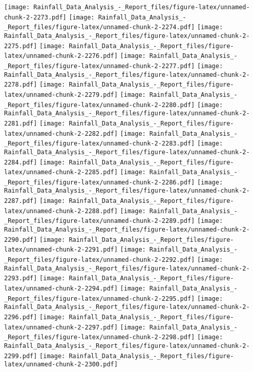 \documentclass[
]{article}
\begin{document}
\texttt{[image: Rainfall\_Data\_Analysis\_-\_Report\_files/figure-latex/unnamed-chunk-2-2273.pdf]}
\texttt{[image: Rainfall\_Data\_Analysis\_-\_Report\_files/figure-latex/unnamed-chunk-2-2274.pdf]}
\texttt{[image: Rainfall\_Data\_Analysis\_-\_Report\_files/figure-latex/unnamed-chunk-2-2275.pdf]}
\texttt{[image: Rainfall\_Data\_Analysis\_-\_Report\_files/figure-latex/unnamed-chunk-2-2276.pdf]}
\texttt{[image: Rainfall\_Data\_Analysis\_-\_Report\_files/figure-latex/unnamed-chunk-2-2277.pdf]}
\texttt{[image: Rainfall\_Data\_Analysis\_-\_Report\_files/figure-latex/unnamed-chunk-2-2278.pdf]}
\texttt{[image: Rainfall\_Data\_Analysis\_-\_Report\_files/figure-latex/unnamed-chunk-2-2279.pdf]}
\texttt{[image: Rainfall\_Data\_Analysis\_-\_Report\_files/figure-latex/unnamed-chunk-2-2280.pdf]}
\texttt{[image: Rainfall\_Data\_Analysis\_-\_Report\_files/figure-latex/unnamed-chunk-2-2281.pdf]}
\texttt{[image: Rainfall\_Data\_Analysis\_-\_Report\_files/figure-latex/unnamed-chunk-2-2282.pdf]}
\texttt{[image: Rainfall\_Data\_Analysis\_-\_Report\_files/figure-latex/unnamed-chunk-2-2283.pdf]}
\texttt{[image: Rainfall\_Data\_Analysis\_-\_Report\_files/figure-latex/unnamed-chunk-2-2284.pdf]}
\texttt{[image: Rainfall\_Data\_Analysis\_-\_Report\_files/figure-latex/unnamed-chunk-2-2285.pdf]}
\texttt{[image: Rainfall\_Data\_Analysis\_-\_Report\_files/figure-latex/unnamed-chunk-2-2286.pdf]}
\texttt{[image: Rainfall\_Data\_Analysis\_-\_Report\_files/figure-latex/unnamed-chunk-2-2287.pdf]}
\texttt{[image: Rainfall\_Data\_Analysis\_-\_Report\_files/figure-latex/unnamed-chunk-2-2288.pdf]}
\texttt{[image: Rainfall\_Data\_Analysis\_-\_Report\_files/figure-latex/unnamed-chunk-2-2289.pdf]}
\texttt{[image: Rainfall\_Data\_Analysis\_-\_Report\_files/figure-latex/unnamed-chunk-2-2290.pdf]}
\texttt{[image: Rainfall\_Data\_Analysis\_-\_Report\_files/figure-latex/unnamed-chunk-2-2291.pdf]}
\texttt{[image: Rainfall\_Data\_Analysis\_-\_Report\_files/figure-latex/unnamed-chunk-2-2292.pdf]}
\texttt{[image: Rainfall\_Data\_Analysis\_-\_Report\_files/figure-latex/unnamed-chunk-2-2293.pdf]}
\texttt{[image: Rainfall\_Data\_Analysis\_-\_Report\_files/figure-latex/unnamed-chunk-2-2294.pdf]}
\texttt{[image: Rainfall\_Data\_Analysis\_-\_Report\_files/figure-latex/unnamed-chunk-2-2295.pdf]}
\texttt{[image: Rainfall\_Data\_Analysis\_-\_Report\_files/figure-latex/unnamed-chunk-2-2296.pdf]}
\texttt{[image: Rainfall\_Data\_Analysis\_-\_Report\_files/figure-latex/unnamed-chunk-2-2297.pdf]}
\texttt{[image: Rainfall\_Data\_Analysis\_-\_Report\_files/figure-latex/unnamed-chunk-2-2298.pdf]}
\texttt{[image: Rainfall\_Data\_Analysis\_-\_Report\_files/figure-latex/unnamed-chunk-2-2299.pdf]}
\texttt{[image: Rainfall\_Data\_Analysis\_-\_Report\_files/figure-latex/unnamed-chunk-2-2300.pdf]}
\end{document}
